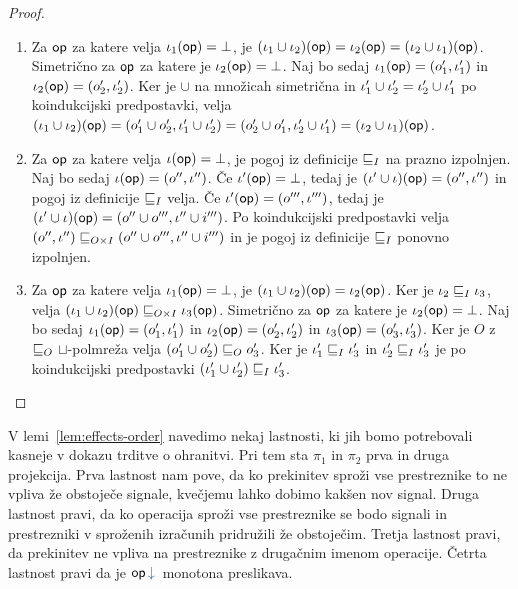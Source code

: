 \begin{proof}
	\begin{enumerate}
		\item Za $\mathsf{op}$ za katere velja $\iota_1(\mathsf{op}) = \bot$, je $(\iota_1 \cup \iota_2)(\mathsf{op}) = \iota_2(\mathsf{op}) = (\iota_2 \cup \iota_1)(\mathsf{op})$.
		Simetrično za $\mathsf{op}$ za katere je $\iota_2(\mathsf{op}) = \bot$.
		Naj bo sedaj $\iota_1(\mathsf{op}) = (o_1', \iota_1')$ in $\iota_2(\mathsf{op}) = (o_2', \iota_2')$.
		Ker je $\cup$ na množicah simetrična in $\iota_1' \cup \iota_2' = \iota_2' \cup \iota_1'$ po koindukcijski predpostavki, velja $(\iota_1 \cup \iota_2)(\mathsf{op}) = (o_1' \cup o_2', \iota_1' \cup \iota_2') = (o_2' \cup o_1', \iota_2' \cup \iota_1') = (\iota_2 \cup \iota_1)(\mathsf{op})$.
		
		\item Za $\mathsf{op}$ za katere velja $\iota(\mathsf{op}) = \bot$, je pogoj iz definicije $\sqsubseteq_{I}$ na prazno izpolnjen.
		Naj bo sedaj $\iota(\mathsf{op}) = (o'', \iota'')$. 
		Če $\iota'(\mathsf{op}) = \bot$, tedaj je $(\iota' \cup \iota)(\mathsf{op}) = (o'', \iota'')$ in pogoj iz definicije $\sqsubseteq_{I}$ velja.
		Če $\iota'(\mathsf{op}) = (o''', \iota''')$, tedaj je $(\iota' \cup \iota)(\mathsf{op}) = (o'' \cup o''', \iota'' \cup i''')$.
		Po koindukcijski predpostavki velja $(o'', \iota'') \sqsubseteq_{O \times I} (o'' \cup o''', \iota'' \cup i''')$ in je pogoj iz definicije $\sqsubseteq_{I}$ ponovno izpolnjen.
		
		\item Za $\mathsf{op}$ za katere velja $\iota_1(\mathsf{op}) = \bot$, je $(\iota_1 \cup \iota_2)(\mathsf{op}) = \iota_2(\mathsf{op})$. Ker je $\iota_2 \sqsubseteq_{I} \iota_3$, velja $(\iota_1 \cup \iota_2)(\mathsf{op}) \sqsubseteq_{O \times I} \iota_3(\mathsf{op})$.
		Simetrično za $\mathsf{op}$ za katere je $\iota_2(\mathsf{op}) = \bot$.
		Naj bo sedaj $\iota_1(\mathsf{op}) = (o_1', \iota_1')$ in $\iota_2(\mathsf{op}) = (o_2', \iota_2')$ in $\iota_3(\mathsf{op}) = (o_3', \iota_3')$. Ker je $O$ z $\sqsubseteq_{O}$ $\sqcup$-polmreža velja $(o_1' \cup o_2') \sqsubseteq_{O} o_3'$. Ker je $\iota_1' \sqsubseteq_{I} \iota_3'$ in $\iota_2' \sqsubseteq_{I} \iota_3'$ je po koindukcijski predpostavki $(\iota_1' \cup \iota_2') \sqsubseteq_{I} \iota_3'$.
	\end{enumerate}

\end{proof}

V lemi~\ref{lem:effects-order} navedimo nekaj lastnosti, ki jih bomo potrebovali kasneje v dokazu trditve o ohranitvi.
Pri tem sta $\pi_1$ in $\pi_2$ prva in druga projekcija.
Prva lastnost nam pove, da ko prekinitev sproži vse prestreznike to ne vpliva že obstoječe signale, kvečjemu lahko dobimo kakšen nov signal.
Druga lastnost pravi, da ko operacija sproži vse prestreznike se bodo signali in prestrezniki v sproženih izračunih pridružili že obstoječim.
Tretja lastnost pravi, da prekinitev ne vpliva na prestreznike z drugačnim imenom operacije.
Četrta lastnost pravi da je $\opincomp{op}{}$ monotona preslikava.

